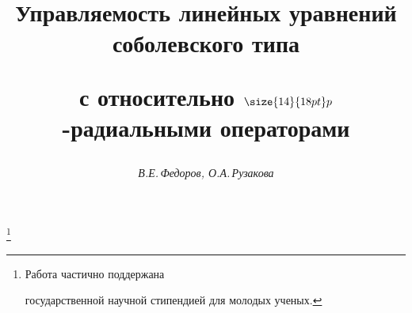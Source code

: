 




%





\newcommand{\const}{\operatorname{const}}


\newcommand{\cl}{\operatorname{Cl}}


\newcommand{\im}{\operatorname{im}}


\newcommand{\dom}{\operatorname{dom}}


\newcommand{\tts}[1]{}







\setcounter{page}{54}















\author{\it В.Е.\,Федоров, О.А.\,Рузакова}




\title{Управляемость линейных уравнений соболевского типа


с относительно $\size{14}{18pt}\selectfont p$-радиальными операторами}


\thanks{Работа частично поддержана


государственной научной стипендией для молодых ученых.}





\date{}




\pagestyle{plain} %





